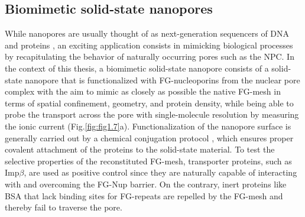 \subsection{Biomimetic solid-state nanopores}
While nanopores are usually thought of as next-generation sequencers of DNA \cite{Manrao2010} and proteins \cite{Brinkerhoff2021}, an exciting application consists in mimicking biological processes by recapitulating the behavior of naturally occurring pores such as the NPC. In the context of this thesis, a biomimetic solid-state nanopore consists of a solid-state nanopore that is functionalized with FG-nucleoporins from the nuclear pore complex with the aim to mimic as closely as possible the native FG-mesh in terms of spatial confinement, geometry, and protein density, while being able to probe the transport across the pore with single-molecule resolution by measuring the ionic current (Fig.\ref{fig:fig1.7}a). Functionalization of the nanopore surface is generally carried out by a chemical conjugation protocol \cite{Kowalczyk2011a,Ananth2018}, which ensures proper covalent attachment of the proteins to the solid-state material. To test the selective properties of the reconstituted FG-mesh, transporter proteins, such as Imp$\beta$, are used as positive control since they are naturally capable of interacting with and overcoming the FG-Nup barrier. On the contrary, inert proteins like BSA that lack binding sites for FG-repeats are repelled by the FG-mesh and thereby fail to traverse the pore. 

